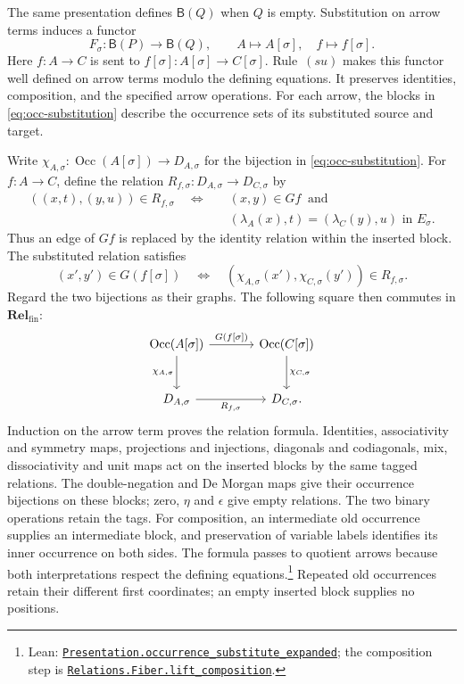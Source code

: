 \documentclass[11pt]{article}
\newcommand{\B}{\mathsf B}
\newcommand{\Occ}{\operatorname{Occ}}
\newcommand{\Rel}{\mathbf{Rel}_{\mathrm{fin}}}
\begin{document}
The same presentation defines $\B(Q)$ when $Q$ is empty.
Substitution on arrow terms induces a functor
\[
 F_\sigma:\B(P)\longrightarrow\B(Q),\qquad
 A\longmapsto A[\sigma],\quad f\longmapsto f[\sigma].
\]
Here $f:A\to C$ is sent to
$f[\sigma]:A[\sigma]\to C[\sigma]$.
Rule~$(su)$ makes this functor well defined on arrow terms modulo the
defining equations. It preserves identities, composition, and the
specified arrow operations. For each arrow, the blocks in
\eqref{eq:occ-substitution} describe the occurrence sets of its
substituted source and target.

Write $\chi_{A,\sigma}:\Occ(A[\sigma])\to D_{A,\sigma}$ for
the bijection in \eqref{eq:occ-substitution}. For $f:A\to C$,
define the relation
$R_{f,\sigma}:D_{A,\sigma}\to D_{C,\sigma}$ by
\[
 \begin{aligned}
 ((x,t),(y,u))\in R_{f,\sigma}
 \quad\Longleftrightarrow\quad&
 (x,y)\in Gf\ \text{ and}\\
 &(\lambda_A(x),t)=(\lambda_C(y),u)\text{ in }E_\sigma.
 \end{aligned}
\]
Thus an edge of $Gf$ is replaced by the identity relation within
the inserted block. The substituted relation satisfies
\[
 (x',y')\in G(f[\sigma])
 \quad\Longleftrightarrow\quad
 (\chi_{A,\sigma}(x'),\chi_{C,\sigma}(y'))\in R_{f,\sigma}.
\]
Regard the two bijections as their graphs. The following square
then commutes in $\Rel$:
\[
\begin{tikzcd}[column sep=large,row sep=large]
 \Occ(A[\sigma])\arrow[r,"{G(f[\sigma])}"]
    \arrow[d,"{\chi_{A,\sigma}}"']
   &\Occ(C[\sigma])\arrow[d,"{\chi_{C,\sigma}}"]\\
 D_{A,\sigma}\arrow[r,"{R_{f,\sigma}}"']&D_{C,\sigma}.
\end{tikzcd}
\]
Induction on the arrow term proves the relation formula.
Identities, associativity and symmetry maps, projections and
injections, diagonals and codiagonals, mix, dissociativity and
unit maps act on the inserted blocks by the same tagged relations.
The double-negation and De Morgan maps give their occurrence
bijections on these blocks; zero, $\eta$ and $\epsilon$ give
empty relations. The two binary
operations retain the tags. For composition, an intermediate old
occurrence supplies an intermediate block, and preservation of
variable labels identifies its inner occurrence on both sides.
The formula passes to quotient arrows because both interpretations
respect the defining equations.\footnote{\raggedright Lean:
\href{https://github.com/flengyel/Dosen-Petric-Maximality/blob/5dbee39bea09539bd130f729e82636419f71f920/DosenPetric/PresentationSubstitutionRelation.lean\#L61}{\texttt{Presentation.\allowbreak{}occurrence\_substitute\_expanded}};
the composition step is
\href{https://github.com/flengyel/Dosen-Petric-Maximality/blob/5dbee39bea09539bd130f729e82636419f71f920/DosenPetric/SubstitutionFiberRelations.lean\#L48}{\texttt{Relations.Fiber.\allowbreak{}lift\_composition}}.}
Repeated old occurrences retain their different first coordinates;
an empty inserted block supplies no positions.
\end{document}
